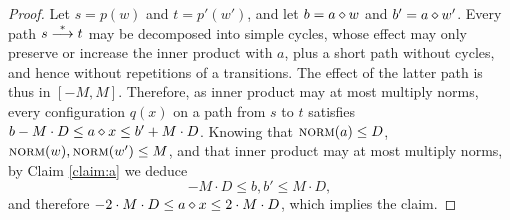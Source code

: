 \begin{proof}
Let $s=p(w)$ and $t=p'(w')$, and let $b = a \diamond w$ and $b' = a \diamond w'$.
Every path $s \stackrel{*}{\longrightarrow} t$ may be decomposed into simple cycles, whose effect may only preserve or increase
the inner product with $a$, plus a short path without cycles, and hence without repetitions of a transitions.
The effect of the latter path is thus in $[-M,M]$.
Therefore, as inner product may at most multiply norms, 
every configuration $q(x)$ on a path from $s$ to $t$ satisfies
$b-M \cdot D \leq a \diamond x \leq b'+M \cdot D$.
Knowing that $\textsc{norm}(a)\leq D$, $\textsc{norm}(w), \textsc{norm}(w')\leq M$, 
and that inner product may at most multiply norms, 
by Claim \ref{claim:a} we deduce 
\[
-M\cdot D \leq b, b' \leq M\cdot D,
\]
and therefore
$-2\cdot M\cdot D \leq a \diamond x \leq 2\cdot M \cdot D$,
which implies the claim.
\end{proof}

